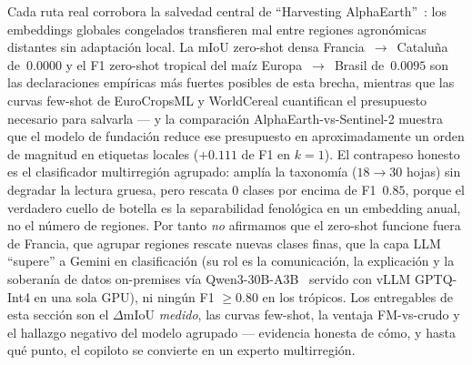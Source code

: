Cada ruta real corrobora la salvedad central de ``Harvesting
AlphaEarth''~\cite{harvesting2026alphaearth}: los embeddings globales
congelados transfieren mal entre regiones agronómicas distantes sin
adaptación local. La mIoU zero-shot densa
Francia~$\rightarrow$~Cataluña de~$0.0000$ y el F1 zero-shot tropical del
maíz Europa~$\rightarrow$~Brasil de~$0.0095$ son las declaraciones
empíricas más fuertes posibles de esta brecha, mientras que las curvas
few-shot de EuroCropsML y WorldCereal cuantifican el presupuesto
necesario para salvarla --- y la comparación AlphaEarth-vs-Sentinel-2
muestra que el modelo de fundación reduce ese presupuesto en
aproximadamente un orden de magnitud en etiquetas locales ($+0.111$ de F1
en $k{=}1$). El contrapeso honesto es el clasificador multirregión
agrupado: amplía la taxonomía ($18\rightarrow30$ hojas) sin degradar la
lectura gruesa, pero rescata $0$ clases por encima de F1~$0.85$, porque
el verdadero cuello de botella es la separabilidad fenológica en un
embedding anual, no el número de regiones. Por tanto \emph{no} afirmamos
que el zero-shot funcione fuera de Francia, que agrupar regiones rescate
nuevas clases finas, que la capa LLM ``supere'' a Gemini en
clasificación (su rol es la comunicación, la explicación y la soberanía
de datos on-premises vía Qwen3-30B-A3B~\cite{yang2025qwen3} servido con
vLLM GPTQ-Int4 en una sola GPU), ni ningún F1 $\geq$0.80 en los
trópicos. Los entregables de esta sección son el $\Delta$mIoU
\emph{medido}, las curvas few-shot, la ventaja FM-vs-crudo y el hallazgo
negativo del modelo agrupado --- evidencia honesta de cómo, y hasta qué
punto, el copiloto se convierte en un experto multirregión.

